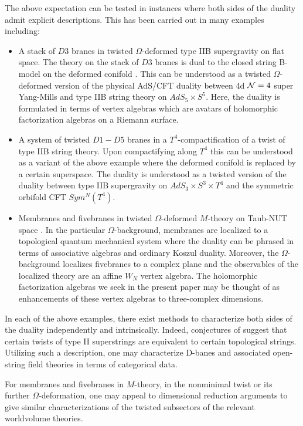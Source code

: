 The above expectation can be tested in instances where both sides of the duality admit explicit descriptions.
This has been carried out in many examples including:
\begin{itemize}
  \item A stack of $D3$ branes in twisted $\Omega$-deformed type IIB supergravity on flat space. The theory on the stack of $D3$ branes is dual to the closed string B-model on the deformed conifold \cite{costello2021twisted}. This can be understood as a twisted $\Omega$-deformed version of the physical AdS/CFT duality between 4d $\mathcal N=4$ super Yang-Mills and type IIB string theory on $AdS_{5}\times S^{5}$. Here, the duality is formulated in terms of vertex algebras which are avatars of holomorphic factorization algebras on a Riemann surface.

  \item A system of twisted $D1-D5$ branes in a $T^{4}$-compactification of a twist of type IIB string theory. Upon compactifying along $T^4$ this can be understood as a variant of the above example where the deformed conifold is replaced by a certain superspace. The duality is understood as a twisted version of the duality between type IIB supergravity on $AdS_{3}\times S^{3}\times T^{4}$ and the symmetric orbifold CFT $Sym^{N}(T^{4})$.

  \item Membranes and fivebranes in twisted $\Omega$-deformed $M$-theory on Taub-NUT space \cite{CostelloM5,CostelloM2}.
In the particular $\Omega$-background, membranes are localized to a topological quantum mechanical system where the duality can be phrased in terms of associative algebras and ordinary Koszul duality. Moreover, the $\Omega$-background localizes fivebranes to a complex plane and the observables of the localized theory are an affine $W_{N}$ vertex algebra. The holomorphic factorization algebras we seek in the present paper may be thought of as enhancements of these vertex algebras to three-complex dimensions.
\end{itemize}

In each of the above examples, there exist methods to characterize both sides of the duality independently and intrinsically. Indeed, conjectures of \cite{CLsugra} suggest that certain twists of type II superstrings are equivalent to certain topological strings. Utilizing such a description, one may characterize D-banes and associated open-string field theories in terms of categorical data.

For membranes and fivebranes in $M$-theory, in the nonminimal twist or its further $\Omega$-deformation, one may appeal to dimensional reduction arguments to give similar characterizations of the twisted subsectors of the relevant worldvolume theories.

